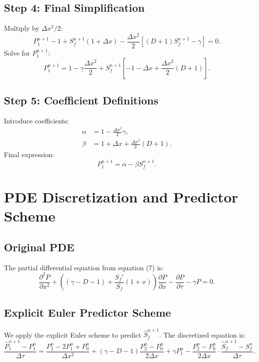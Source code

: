 \documentclass{article}
\begin{document}
\subsection{Step 4: Final Simplification}
Multiply by $\Delta x^2/2$:
\begin{equation}
P_1^{n+1} - 1 + S_f^{n+1}(1 + \Delta x) - \frac{\Delta x^2}{2}[(D + 1)S_f^{n+1} - \gamma] = 0.
\end{equation}
Solve for $P_1^{n+1}$:
\begin{equation}
P_1^{n+1} = 1 - \gamma\frac{\Delta x^2}{2} + S_f^{n+1}\left[-1 - \Delta x + \frac{\Delta x^2}{2}(D + 1)\right].
\end{equation}

\subsection{Step 5: Coefficient Definitions}
Introduce coefficients:
\begin{align}
\alpha &= 1 - \frac{\Delta x^2}{2}\gamma, \\
\beta &= 1 + \Delta x + \frac{\Delta x^2}{2}(D + 1).
\end{align}
Final expression:
\begin{equation}
P_1^{n+1} = \alpha - \beta S_f^{n+1}.
\end{equation}

\section{PDE Discretization and Predictor Scheme}

\subsection{Original PDE}
The partial differential equation from equation (7) is:
\begin{equation}
\frac{\partial^2 P}{\partial x^2} + \left( (\gamma - D - 1)  + \frac{S_f'}{S_f} (1 + x) \right) \frac{\partial P}{\partial x} -  \frac{\partial P}{\partial \tau} - \gamma  P = 0.
\end{equation}

\subsection{Explicit Euler Predictor Scheme}
We apply the explicit Euler scheme to predict $\hat{S}_f^{n+1}$. The discretized equation is:
\begin{equation}
\frac{\hat{P}_1^{n+1} - P_1^n}{\Delta \tau} = \frac{P_2^n - 2P_1^n + P_0^n}{\Delta x^2} + (\gamma - D - 1) \frac{P_2^n - P_0^n}{2\Delta x} + \gamma P_1^n - \frac{P_2^n - P_0^n}{2\Delta x} \cdot \frac{\hat{S}_f^{n+1} - S_f^n}{\Delta \tau}.
\end{equation}
\end{document}
